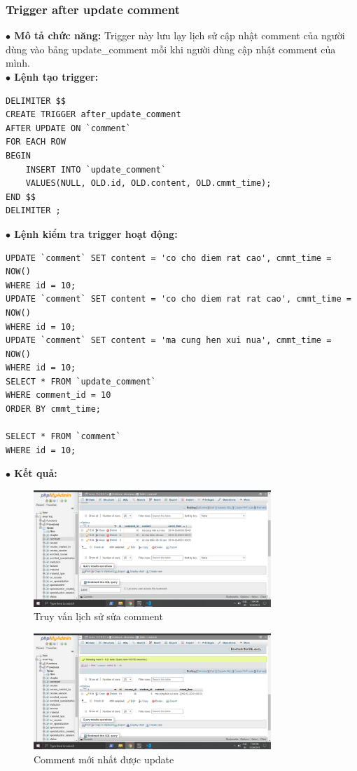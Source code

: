 \documentclass[12pt,a4paper,titlepage]{article}
\begin{document}
\subsubsection{Trigger after update comment}
\textbf{$\bullet$ Mô tả chức năng:} Trigger này lưu lạy lịch sử cập nhật comment của người dùng vào bảng update_comment mỗi khi người dùng cập nhật comment của mình.\\
\textbf{$\bullet$ Lệnh tạo trigger:}
\begin{lstlisting}
DELIMITER $$
CREATE TRIGGER after_update_comment
AFTER UPDATE ON `comment`
FOR EACH ROW
BEGIN
	INSERT INTO `update_comment`
    VALUES(NULL, OLD.id, OLD.content, OLD.cmmt_time);
END $$
DELIMITER ;
\end{lstlisting}
\textbf{$\bullet$ Lệnh kiểm tra trigger hoạt động:}
\begin{lstlisting}
UPDATE `comment` SET content = 'co cho diem rat cao', cmmt_time = NOW()
WHERE id = 10;
UPDATE `comment` SET content = 'co cho diem rat rat cao', cmmt_time = NOW()
WHERE id = 10;
UPDATE `comment` SET content = 'ma cung hen xui nua', cmmt_time = NOW()
WHERE id = 10;
SELECT * FROM `update_comment`
WHERE comment_id = 10
ORDER BY cmmt_time;

SELECT * FROM `comment`
WHERE id = 10;
\end{lstlisting}
\textbf{$\bullet$ Kết quả:}
\begin{figure}[h!]
	\centering
	\caption{Truy vấn lịch sử sửa comment}
	\includegraphics[width=0.8\textwidth]{images/cmmt3.png}
\end{figure}
\begin{figure}[h!]
	\centering
	\caption{Comment mới nhất được update}
	\includegraphics[width=0.8\textwidth]{images/cmmt4.png}
\end{figure}
\end{document}
